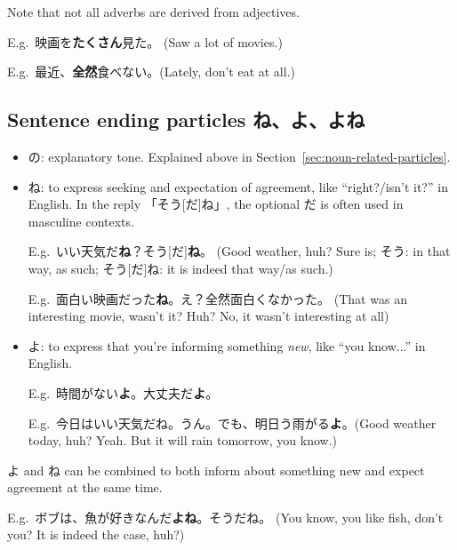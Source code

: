 \documentclass[../nihongo-gakushuu-kyouzai.tex]{subfiles}
\begin{document}
Note that not all adverbs are derived from adjectives.

E.g.\ 映画を\textbf{たくさん}見た。 (Saw a lot of movies.)

E.g.\ 最近、\textbf{全然}食べない。(Lately, don't eat at all.)

\subsection{Sentence ending particles ね、よ、よね} \label{sec:sentence-ending-particles}
\begin{itemize}
    \item の: explanatory tone. Explained above in Section~\ref{sec:noun-related-particles}.
    \item ね: to express seeking and expectation of agreement, like ``right?/isn't it?'' in English. In the reply 「そう[だ]ね」, the optional だ is often used in masculine contexts.

    E.g.\ いい天気だ\textbf{ね}？そう[だ]\textbf{ね}。 (Good weather, huh? Sure is; そう: in that way, as such; そう[だ]ね: it is indeed that way/as such.)

    E.g.\ 面白い映画だった\textbf{ね}。え？全然面白くなかった。 (That was an interesting movie, wasn't it? Huh? No, it wasn't interesting at all)
    \item よ: to express that you're informing something \emph{new}, like ``you know...'' in English.

    E.g.\ 時間がない\textbf{よ}。大丈夫だ\textbf{よ}。

    E.g.\ 今日はいい天気だね。うん。でも、明日う雨がる\textbf{よ}。(Good weather today, huh? Yeah. But it will rain tomorrow, you know.)
\end{itemize}

よ and ね can be combined to both inform about something new and expect agreement at the same time.

E.g.\ ボブは、魚が好きなんだ\textbf{よね}。そうだね。 (You know, you like fish, don't you? It is indeed the case, huh?)
\end{document}
